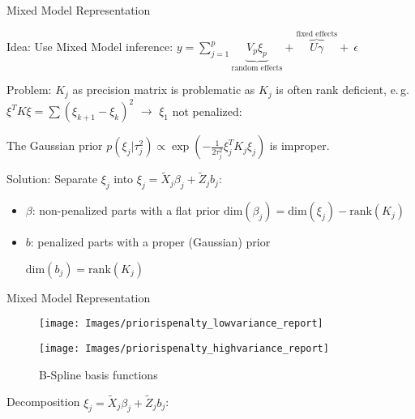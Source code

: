 \documentclass[12pt]{article}
\begin{document}


Mixed Model Representation

Idea: Use Mixed Model inference: $y = \sum_{j=1}^p \underbrace{V_p \xi_p}_{\text{random effects}} + \overbrace{U \gamma}^{\text{fixed effects}} + \: \epsilon$





Problem: $K_j$ as precision matrix is problematic as $K_j$ is often rank deficient, 
e.\,g. $\xi^TK\xi = \sum(\xi_{k+1} - \xi_{k})^2$ $\rightarrow$ $\xi_1$ not penalized:

The Gaussian prior $p(\xi_j|\tau_j^2) \propto \exp\left(-\frac{1}{2\tau^2_j} \xi_j^TK_j \xi_j\right)$ is improper.




Solution: Separate $\xi_j$ into $\xi_j = \tilde{X}_j \beta_j + \tilde{Z}_j b_j$:

\begin{itemize} 
\item $\beta$: non-penalized parts with a flat prior 
$\text{dim}(\beta_j) = \text{dim}(\xi_j) {-} \text{rank}(K_j)$  

\item $b$: penalized parts with a proper (Gaussian) prior 

$\text{dim}(b_j) =\text{rank}(K_j)$
\end{itemize}


Mixed Model Representation

\begin{figure}
\centering
\hspace{-5.5em}
\begin{minipage}{.5\textwidth}
  \centering
  \texttt{[image: Images/priorispenalty\_lowvariance\_report]}
\end{minipage}%
\hspace{-2em}
\begin{minipage}{.5\textwidth}
  \centering
  \texttt{[image: Images/priorispenalty\_highvariance\_report]}
\end{minipage}
\vspace{-1em}
\caption[caption]{B-Spline basis functions}\label{bsplines}
\end{figure}



Decomposition $\xi_j = \tilde{X}_j \beta_j + \tilde{Z}_j b_j$: 
\end{document}
